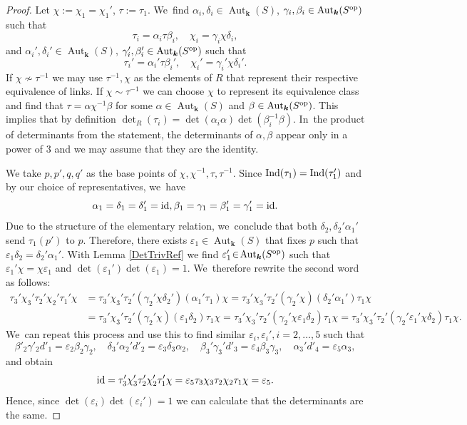 \documentclass[JEP,XML,SOM,Unicode,NoFloatCountersInSection, NoEqCountersInSection,published]{cedram}
\newcommand{\id}{\textup{id}}
\newcommand{\Ind}{\textup{Ind}}
\newcommand{\op}{\textup{op}}
\let\epsilon\varepsilon
\theoremstyle{definition}
\newcommand{\kk}{{\boldsymbol{k}}}
\DeclareMathOperator{\Aut}{Aut}
\begin{document}
\begin{proof}
Let $\chi := \chi_1 = \chi_1'$, $\tau:= \tau_1$. We~find $\alpha_i, \delta_i \in \Aut_{\kk}(S)$, $\gamma_i, \beta_i \in \Aut_{\kk}(S^{\op}) $ such that
\[
\tau_i = \alpha_i \tau \beta_i, \quad \chi_i = \gamma_i \chi \delta_i,
\]
and $\alpha_i', \delta_i' \in \Aut_{\kk}(S)$, $\gamma_i', \beta_i' \in \Aut_{\kk}(S^{\op})$ such that
\[
\tau_i' = \alpha_i' \tau \beta_i', \quad \chi_i' = \gamma_i' \chi \delta_i'.
\]
If $\chi \not \sim \tau^{-1}$ we may use $\tau^{-1}, \chi$ as the elements of $R$ that represent their respective equivalence of links. If $\chi \sim \tau^{-1}$ we can choose $\chi$ to represent its equivalence class and find that $\tau = \alpha \chi^{-1} \beta$ for some $\alpha \in \Aut_{\kk}(S)$ and $\beta \in \Aut_{\kk}(S^{\op})$. This implies that by definition $\det_R(\tau_i) = \det(\alpha_i \alpha) \det(\beta_i^{-1} \beta)$. In~the product of determinants from the statement, the determinants of $\alpha, \beta$ appear only in a power of $3$ and we may assume that they are the identity.

We take $p,p',q,q'$ as the base points of $\chi, \chi^{-1},\tau,\tau^{-1}$. Since $\Ind(\tau_1) = \Ind(\tau_1')$ and by our choice of representatives, we~have
\[
\alpha_1 = \delta_1 = \delta_1' =\id, \beta_1=\gamma_1=\beta_1'= \gamma_1' = \id.
\]
Due to the structure of the elementary relation, we~conclude that both $\delta_2, \delta_2'\alpha_1'$ send $\tau_1(p')$ to $p$. Therefore, there exists $\epsilon_1 \in \Aut_{\kk}(S)$ that fixes $p$ such that $\epsilon_1\delta_2 = \delta_2'\alpha_1'$. With Lemma \ref{DetTrivRef} we find $\epsilon_1' \!\in\! \Aut_{\kk}(S^{\op})$ such that $\epsilon_1' \chi \!=\! \chi \epsilon_1$ and $\det(\epsilon_1')\det(\epsilon_1) \!=\! 1$. We~therefore rewrite the second word as follows:
\begin{align*}
\tau_3'\chi_3'\tau_2'\chi_2'\tau_1'\chi &= \tau_3'\chi_3'\tau_2'(\gamma_2'\chi\delta_2')(\alpha_1'\tau_1) \chi = \tau_3'\chi_3'\tau_2'(\gamma_2'\chi)(\delta_2'\alpha_1')\tau_1 \chi
\\
&= \tau_3'\chi_3'\tau_2'(\gamma_2'\chi) (\epsilon_1\delta_2) \tau_1\chi = \tau_3'\chi_3'\tau_2'(\gamma_2'\chi \epsilon_1 \delta_2) \tau_1 \chi = \tau_3'\chi_3'\tau_2'(\gamma_2'\epsilon_1'\chi \delta_2)\tau_1\chi.
\end{align*}
We~can repeat this process and use this to find similar $\epsilon_i,\epsilon_i', i = 2, \dots ,5$ such that
\[
\beta'_2\gamma'_2 d'_1 = \epsilon_2 \beta_2 \gamma_2 , \quad \delta_3'\alpha_{2}'d'_{2} = \epsilon_{3} \delta_3\alpha_2, \quad \beta_3'\gamma_3' d'_{3} = \epsilon_{4} \beta_3 \gamma_3, \quad \alpha_3'd'_{4} = \epsilon_5 \alpha_3,
\]
and obtain
\[
\id = \tau_3'\chi_3'\tau_2'\chi_2'\tau_1'\chi = \epsilon_5\tau_3\chi_3\tau_2\chi_2\tau_1\chi = \epsilon_5.
\]
Hence, since $\det(\epsilon_i)\det(\epsilon_i')=1$ we can calculate that the determinants are the same.
\end{proof}
\end{document}
